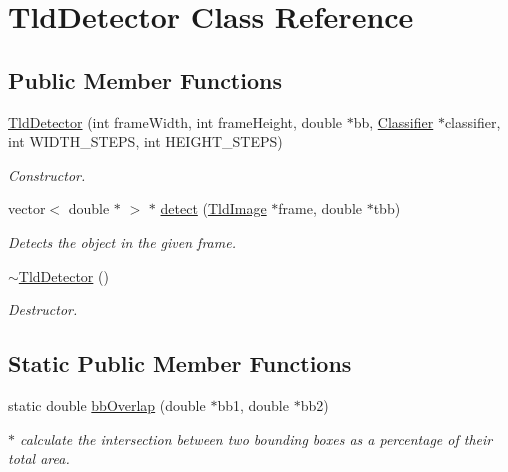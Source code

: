 \hypertarget{class_tld_detector}{\section{\-Tld\-Detector \-Class \-Reference}
\label{class_tld_detector}
}
\subsection*{\-Public \-Member \-Functions}
\begin{DoxyCompactItemize}
\item 
\hyperlink{class_tld_detector_a4118c1097c07c4e63a50325231798475}{\-Tld\-Detector} (int frame\-Width, int frame\-Height, double $\ast$bb, \hyperlink{class_classifier}{\-Classifier} $\ast$classifier, int \-W\-I\-D\-T\-H\-\_\-\-S\-T\-E\-P\-S, int \-H\-E\-I\-G\-H\-T\-\_\-\-S\-T\-E\-P\-S)
\begin{DoxyCompactList}\small\item\em \-Constructor. \end{DoxyCompactList}\item 
vector$<$ double $\ast$ $>$ $\ast$ \hyperlink{class_tld_detector_a99913cb396a77c6d4b373dcdf72e569c}{detect} (\hyperlink{class_tld_image}{\-Tld\-Image} $\ast$frame, double $\ast$tbb)
\begin{DoxyCompactList}\small\item\em \-Detects the object in the given frame. \end{DoxyCompactList}\item 
\hypertarget{class_tld_detector_a53f059880d4574a0788bf2fe3ccca49d}{\hyperlink{class_tld_detector_a53f059880d4574a0788bf2fe3ccca49d}{$\sim$\-Tld\-Detector} ()}\label{class_tld_detector_a53f059880d4574a0788bf2fe3ccca49d}

\begin{DoxyCompactList}\small\item\em \-Destructor. \end{DoxyCompactList}\end{DoxyCompactItemize}
\subsection*{\-Static \-Public \-Member \-Functions}
\begin{DoxyCompactItemize}
\item 
static double \hyperlink{class_tld_detector_af3b8e530904c7d36546f5ccc1f71de53}{bb\-Overlap} (double $\ast$bb1, double $\ast$bb2)
\begin{DoxyCompactList}\small\item\em $\ast$ calculate the intersection between two bounding boxes as a percentage of their total area. \end{DoxyCompactList}\end{DoxyCompactItemize}


